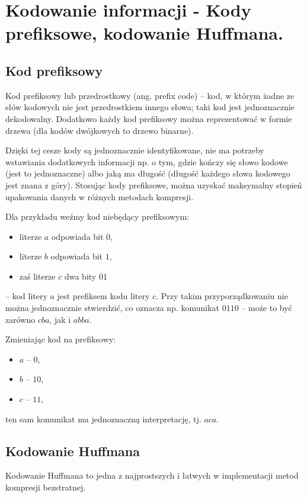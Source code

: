 \section{Kodowanie informacji - Kody prefiksowe, kodowanie Huffmana.}

\subsection{Kod prefiksowy}

Kod prefiksowy lub przedrostkowy (ang. prefix code)
– kod, w którym żadne ze słów kodowych nie jest przedrostkiem innego słowa;
taki kod jest jednoznacznie dekodowalny.
Dodatkowo każdy kod prefiksowy można reprezentować w formie drzewa (dla kodów dwójkowych to drzewo binarne).

Dzięki tej cesze kody są jednoznacznie identyfikowane,
nie ma potrzeby wstawiania dodatkowych informacji np. o tym, gdzie kończy się słowo kodowe (jest to jednoznaczne)
albo jaką ma długość (długość każdego słowa kodowego jest znana z góry).
Stosując kody prefiksowe, można uzyskać maksymalny stopień upakowania danych w różnych metodach kompresji.

Dla przykładu weźmy kod niebędący prefiksowym:
\begin{itemize}[itemsep=0pt,partopsep=0pt, parsep=0pt]
    \item literze $a$ odpowiada bit $0$,
    \item literze $b$ odpowiada bit $1$,
    \item zaś literze $c$ dwa bity $01$
\end{itemize}
– kod litery $a$ jest prefiksem kodu litery $c$.
Przy takim przyporządkowaniu nie można jednoznacznie stwierdzić,
co oznacza np. komunikat $0110$ – może to być zarówno $cba$, jak i $abba$.

Zmieniając kod na prefiksowy:
\begin{itemize}[itemsep=0pt,partopsep=0pt, parsep=0pt]
    \item $a$ – $0$,
    \item $b$ – $10$,
    \item $c$ – $11$,
\end{itemize}
ten sam komunikat ma jednoznaczną interpretację, tj. $aca$.

\subsection{Kodowanie Huffmana}
Kodowanie Huffmana to jedna z najprostszych i łatwych w implementacji metod kompresji bezstratnej.

